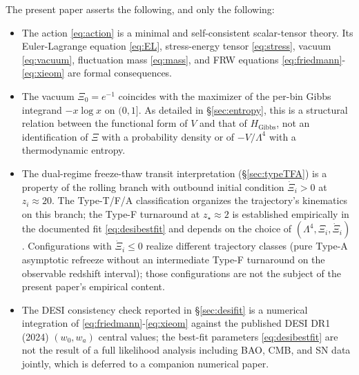 \documentclass[11pt,reqno]{amsart}
\theoremstyle{plain}
\theoremstyle{definition}
\theoremstyle{remark}
\newcommand{\Gibbs}{\mathrm{Gibbs}}
\begin{document}
The present paper asserts the following, and only the following:
\begin{itemize}
  \item The action \eqref{eq:action} is a minimal and self-consistent
        scalar-tensor theory. Its Euler-Lagrange equation \eqref{eq:EL},
        stress-energy tensor \eqref{eq:stress}, vacuum \eqref{eq:vacuum},
        fluctuation mass \eqref{eq:mass}, and FRW equations
        \eqref{eq:friedmann}-\eqref{eq:xieom} are formal consequences.
  \item The vacuum $\Xi_0 = e^{-1}$ coincides with the maximizer of the
        per-bin Gibbs integrand $-x\log x$ on $(0,1]$. As detailed in
        \S\ref{sec:entropy}, this is a structural relation between
        the functional form of $V$ and that of $H_{\Gibbs}$, not an
        identification of $\Xi$ with a probability density or of
        $-V/\Lambda^{4}$ with a thermodynamic entropy.
  \item The dual-regime freeze-thaw transit interpretation
        (\S\ref{sec:typeTFA}) is a property of the rolling branch with
        outbound initial condition $\dot\Xi_i > 0$ at $z_i \approx 20$.
        The Type-T/F/A classification organizes the trajectory's
        kinematics on this branch; the Type-F turnaround at
        $z_\star \approx 2$ is established empirically in the
        documented fit \eqref{eq:desibestfit} and depends on the
        choice of $(\Lambda^4, \Xi_i, \dot\Xi_i)$. Configurations with
        $\dot\Xi_i \leq 0$ realize different trajectory classes (pure
        Type-A asymptotic refreeze without an intermediate Type-F
        turnaround on the observable redshift interval); those
        configurations are not the subject of the present paper's
        empirical content.
  \item The DESI consistency check reported in \S\ref{sec:desifit} is a
        numerical integration of \eqref{eq:friedmann}-\eqref{eq:xieom}
        against the published DESI DR1 (2024) $(w_0, w_a)$ central
        values; the best-fit parameters \eqref{eq:desibestfit} are not
        the result of a full likelihood analysis including BAO, CMB,
        and SN data jointly, which is deferred to a companion numerical
        paper.
\end{itemize}
\end{document}
